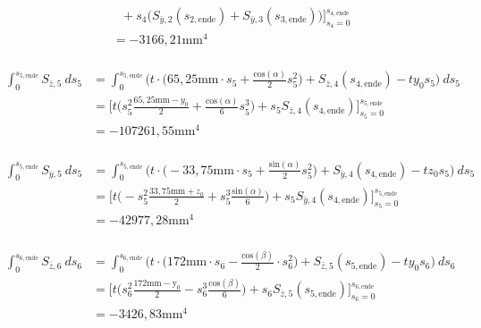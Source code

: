\begin{itemize}
\begin{equation}
\begin{split}
			 &\ \ \ + s_4\bigg(S_{\bar y,2}(s_{2,\mathrm{ende}})  + S_{\bar y,3}(s_{3,\mathrm{ende}})\bigg)\bigg]_{s_4=0}^{s_{4,\mathrm{ende}}}\\\
			 &=-3166,21\mathrm{mm}^4
		\end{split}
	\end{equation}\\
	\begin{equation}
		\begin{split}
			\int_{0}^{s_{5,\mathrm{ende}}} S_{\bar z,5}\ ds_5 &= \int_{0}^{s_{5,\mathrm{ende}}} \bigg(t\cdot\bigg(65,25\mathrm{mm}\cdot s_5 +\frac{\mathrm{cos}(\alpha)}{2}s^2_5\bigg) + S_{\bar z,4}(s_{4,\mathrm{ende}})-ty_0s_5\bigg)\ ds_5\\\
			&= \bigg[t\bigg(s_5^2\frac{65,25\mathrm{mm}-y_0}{2}+\frac{\mathrm{cos}(\alpha)}{6}s^3_5\bigg)+s_5S_{\bar z,4}(s_{4,\mathrm{ende}})\bigg]_{s_5=0}^{s_{5,\mathrm{ende}}}\\\
			&=-107261,55\mathrm{mm}^4
		\end{split}
	\end{equation}\\
	\begin{equation}
		\begin{split}
			\int_{0}^{s_{5,\mathrm{ende}}} S_{\bar y,5}\ ds_5 &= \int_{0}^{s_{5,\mathrm{ende}}} \bigg(t\cdot\bigg(-33,75\mathrm{mm}\cdot s_5 +\frac{\mathrm{sin}(\alpha)}{2}s^2_5\bigg) + S_{\bar y,4}(s_{4,\mathrm{ende}})-tz_0s_5\bigg)\ ds_5\\\
			&=\bigg[t\bigg(-s_5^2\frac{33,75\mathrm{mm}+z_0}{2}+s_5^3\frac{\mathrm{sin}(\alpha)}{6}\bigg)+s_5S_{\bar y,4}(s_{4,\mathrm{ende}})\bigg]_{s_5=0}^{s_{5,\mathrm{ende}}}\\\
			&=-42977,28\mathrm{mm}^4
		\end{split}
	\end{equation}\\
	\begin{equation}
		\begin{split}
			\int_{0}^{s_{6,\mathrm{ende}}} S_{\bar z,6}\ ds_6 &= \int_{0}^{s_{6,\mathrm{ende}}} \bigg(t\cdot\bigg(172\mathrm{mm}\cdot s_6-\frac{\mathrm{cos}(\beta)}{2}\cdot s^2_6\bigg) + S_{\bar z,5}(s_{5,\mathrm{ende}})-ty_0s_6\bigg)\ ds_6\\\
			&=\bigg[t\bigg(s_6^2\frac{172\mathrm{mm-y_0}}{2}-s_6^3\frac{\mathrm{cos}(\beta)}{6}\bigg)+ s_6S_{\bar z,5}(s_{5,\mathrm{ende}})\bigg]_{s_6=0}^{s_{6,\mathrm{ende}}}\\\
			&=-3426,83\mathrm{mm}^4
		\end{split}

\end{equation}
\end{itemize}
